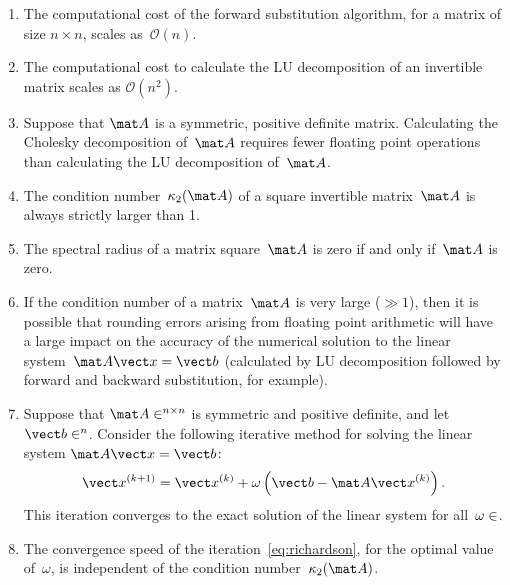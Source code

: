 \documentclass{article}
\begin{document}
\begin{enumerate}

    \item
        The computational cost of the forward substitution algorithm, for a matrix of size $n \times n$,
        scales as~$\mathcal O(n)$.

    \item
        The computational cost to calculate the LU decomposition of an invertible matrix scales as $\mathcal O(n^2)$.

    \item
        Suppose that $\mat A$ is a symmetric, positive definite matrix.
        Calculating the Cholesky decomposition of~$\mat A$ requires fewer floating point operations than calculating the LU decomposition of~$\mat A$.

    \item
        The condition number~$\kappa_2(\mat A)$ of a square invertible matrix~$\mat A$ is always strictly larger than 1.

    \item
        The spectral radius of a matrix square~$\mat A$ is zero if and only if~$\mat A$ is zero.

    \item
        If the condition number of a matrix~$\mat A$ is very large ($\gg 1$),
        then it is possible that rounding errors arising from floating point arithmetic will have a large impact on 
        the accuracy of the numerical solution to the linear system~$\mat A \vect x = \vect b$
        (calculated by LU decomposition followed by forward and backward substitution, for example).

    \item
        Suppose that $\mat A \in \real^{n \times n}$ is symmetric and positive definite,
        and let $\vect b \in \real^n$.
        Consider the following iterative method for solving the linear system $\mat A \vect x = \vect b$:
        \begin{equation}
            \label{eq:richardson}
            \vect x^{(k+1)} = \vect x^{(k)} + \omega \left( \vect b - \mat A \vect x^{(k)} \right).
        \end{equation}
        This iteration converges to the exact solution of the linear system for all~$\omega \in \real$.

    \item
        The convergence speed of the iteration~\eqref{eq:richardson},
        for the optimal value of~$\omega$,
        is independent of the condition number~$\kappa_2(\mat A)$.


\end{enumerate}
\end{document}
